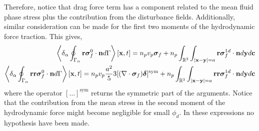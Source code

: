 Therefore, notice that drag force term has a component related to the mean fluid phase stress plus the contribution from the disturbance fields. 
Additionally, similar consideration can be made for the first two moments of the hydrodynamic force traction. 
This gives, 
\begin{align}
    \left<\delta_\alpha \oint_{\Gamma_\alpha} \textbf{r}\bm\sigma_f^0\cdot\textbf{n} d\Gamma\right>[\textbf{x},t]
    =
    n_p v_p \bm\sigma_f
    +
    n_p 
    \int_{\mathbb{R}^3}
    \int_{|\textbf{x}-\textbf{y}|=a}
    \textbf{r}\bm\sigma_f^{1d} \cdot \textbf{n}
    d\textbf{y}
    d\textbf{c}
    \\
    \left<\delta_\alpha \oint_{\Gamma_\alpha} \textbf{rr}\bm\sigma_f^0\cdot\textbf{n} d\Gamma\right>[\textbf{x},t]
    =
    n_pv_p  \frac{a^2}{5} 3 [(\mathbf{\nabla}\cdot \bm\sigma_f)\bm\delta]^\text{sym}
    +
    n_p 
    \int_{\mathbb{R}^3}
    \int_{|\textbf{x}-\textbf{y}|=a}
    \textbf{rr}\bm\sigma_f^{1d} \cdot \textbf{n}
    d\textbf{y}
    d\textbf{c}
    \\
\end{align}
where the operator $[\ldots]^\text{sym}$ returns the symmetric part of the arguments.
Notice that the contribution from the mean stress in the second moment of the hydrodynamic force might become negligible for small $\phi_d$. 
In these expressions no hypothesis have been made. 


